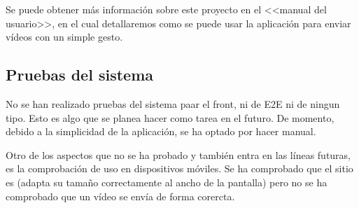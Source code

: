Se puede obtener más información sobre este proyecto en el <<manual del usuario>>, en el cual detallaremos como se puede usar la aplicación para enviar vídeos con un simple gesto.

\subsection{Pruebas del sistema}

No se han realizado pruebas del sistema paar el front, ni de E2E ni de ningun tipo. Esto es algo que se planea hacer como tarea en el futuro. De momento, debido a la simplicidad de la aplicación, se ha optado por hacer  manual.

Otro de los aspectos que no se ha probado y también entra en las líneas futuras, es la comprobación de uso en dispositivos móviles. Se ha comprobado que el sitio es  (adapta su tamaño correctamente al ancho de la pantalla) pero no se ha comprobado que un vídeo se envía de forma corercta.